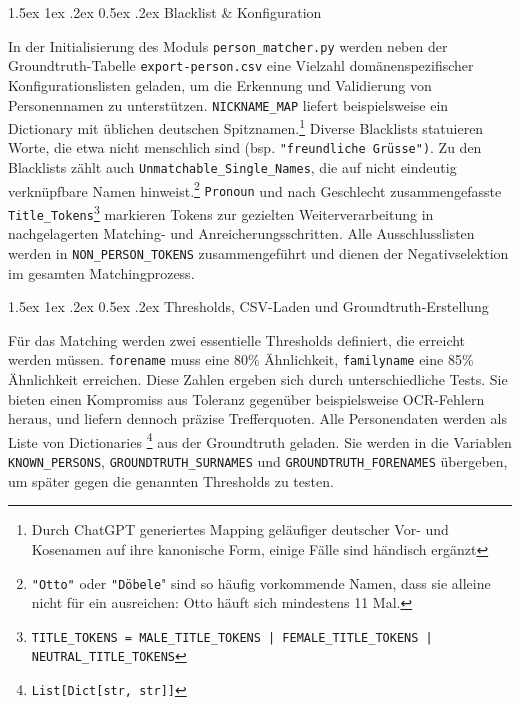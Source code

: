 \documentclass[12pt, a4paper, ngerman, bidi=default]{article}
\makeatletter
\newcommand{\code}[1]{\colorbox{VeryLightGray}{\texttt{#1}}} %
\let\oldparagraph\paragraph%
\renewcommand{\paragraph}{
    \@ifstar%
      \xxxParagraphStar%
      \xxxParagraphNoStar%
 }
\newcommand{\xxxParagraphStar}[1]{\oldparagraph*{#1}\mbox{}}
\newcommand{\xxxParagraphNoStar}[1]{\oldparagraph{#1}\mbox{}}
\renewcommand\paragraph{\@startsection{paragraph}{4}{0em}%
  {1.5ex \@plus1ex \@minus.2ex}%
  {0.5ex \@plus.2ex}%
  {\normalfont\normalsize\bfseries\itshape}}
\makeatother
\begin{document}
\paragraph{Blacklist \& Konfiguration}\label{paragraph:Pers_match/Blacklist}

In der Initialisierung des Moduls \code{person\_matcher.py} werden neben der Groundtruth-Tabelle \texttt{export-person.csv} eine Vielzahl domänenspezifischer Konfigurationslisten geladen, um die Erkennung und Validierung von Personennamen zu unterstützen.
\code{NICKNAME\_MAP} liefert beispielsweise ein Dictionary mit üblichen deutschen Spitznamen.\footnote{Durch ChatGPT generiertes Mapping geläufiger deutscher Vor- und Kosenamen auf ihre kanonische Form, einige Fälle sind händisch ergänzt}
Diverse Blacklists statuieren Worte, die etwa nicht menschlich sind (bsp. \texttt{"freundliche Grüsse")}. Zu den Blacklists zählt auch \code{Unmatchable\_Single\_Names}, die auf nicht eindeutig verknüpfbare Namen hinweist.\footnote{\texttt{"Otto"} oder \texttt{"Döbele}" sind so häufig vorkommende Namen, dass sie alleine nicht für ein  ausreichen: Otto häuft sich mindestens 11 Mal.} \code{Pronoun} und nach Geschlecht zusammengefasste \code{Title\_Tokens}\footnote{\code{TITLE\_TOKENS = MALE\_TITLE\_TOKENS | FEMALE\_TITLE\_TOKENS | NEUTRAL\_TITLE\_TOKENS}} markieren Tokens zur gezielten Weiterverarbeitung in nachgelagerten Matching- und Anreicherungsschritten. Alle Ausschlusslisten werden in \code{NON\_PERSON\_TOKENS} zusammengeführt und dienen der Negativselektion im gesamten Matchingprozess. 

\paragraph{Thresholds, CSV-Laden und Groundtruth-Erstellung}\label{paragraph:Pers_match/Threstholds}

Für das Matching werden zwei essentielle Thresholds definiert, die erreicht werden müssen. \code{forename} muss eine 80\%  Ähnlichkeit, \code{familyname} eine 85\% Ähnlichkeit erreichen. Diese Zahlen ergeben sich durch unterschiedliche Tests. Sie bieten einen Kompromiss aus Toleranz gegenüber beispielsweise OCR-Fehlern heraus, und liefern dennoch präzise Trefferquoten. Alle Personendaten werden als Liste von Dictionaries \footnote{\code{List[Dict[str, str]]}} aus der Groundtruth geladen. Sie werden in die Variablen \code{KNOWN\_PERSONS}, \code{GROUNDTRUTH\_SURNAMES} und \code{GROUNDTRUTH\_FORENAMES} übergeben, um später gegen die genannten Thresholds zu testen.
\end{document}
